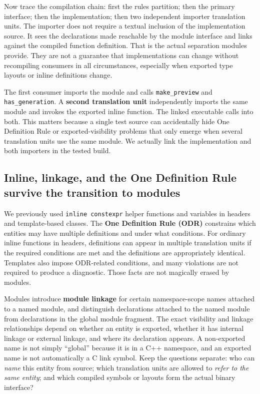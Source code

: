 Now trace the compilation chain: first the rules partition; then the primary interface; then the implementation; then two independent importer translation units. The importer does not require a textual inclusion of the implementation source. It sees the declarations made reachable by the module interface and links against the compiled function definition. That is the actual separation modules provide. They are not a guarantee that implementations can change without recompiling consumers in all circumstances, especially when exported type layouts or inline definitions change.

The first consumer imports the module and calls \texttt{make\_preview} and \texttt{has\_generation}. A \textbf{second translation unit} independently imports the same module and invokes the exported inline function. The linked executable calls into both. This matters because a single test source can accidentally hide One Definition Rule or exported-visibility problems that only emerge when several translation units use the same module. We actually link the implementation and both importers in the tested build.

\subsection{Inline, linkage, and the One Definition Rule survive the transition to modules}\label{01-foundations-i-ch006-inline-linkage-and-the-one-definition-rule-survive-the-transition-to-modules}

We previously used \texttt{inline\ constexpr} helper functions and variables in headers and template-based classes. The \textbf{One Definition Rule (ODR)} constrains which entities may have multiple definitions and under what conditions. For ordinary inline functions in headers, definitions can appear in multiple translation units if the required conditions are met and the definitions are appropriately identical. Templates also impose ODR-related conditions, and many violations are not required to produce a diagnostic. Those facts are not magically erased by modules.

Modules introduce \textbf{module linkage} for certain namespace-scope names attached to a named module, and distinguish declarations attached to the named module from declarations in the global module fragment. The exact visibility and linkage relationships depend on whether an entity is exported, whether it has internal linkage or external linkage, and where its declaration appears. A non-exported name is not simply ``global'' because it is in a C++ namespace, and an exported name is not automatically a C link symbol. Keep the questions separate: who can \emph{name} this entity from source; which translation units are allowed to \emph{refer to the same entity}; and which compiled symbols or layouts form the actual binary interface?

